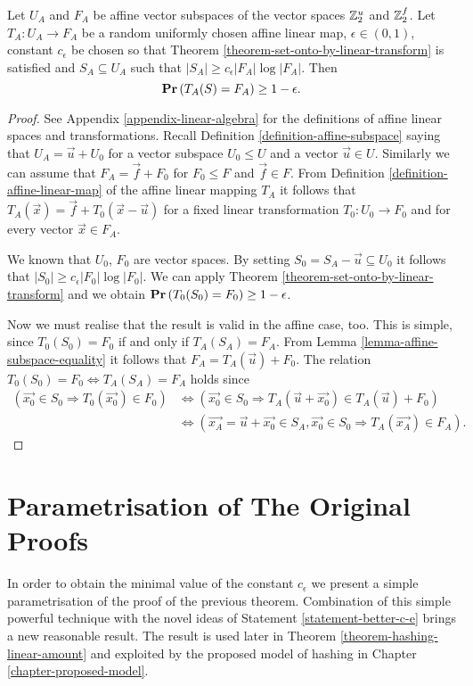 \begin{corollary}
\label{corollary-affine-e2}
Let $U_A$ and $F_A$ be affine vector subspaces of the vector spaces $\mathbb{Z}_{2}^{u}$ and $\mathbb{Z}_{2}^{f}$. Let $T_A: U_A \rightarrow F_A$ be a random uniformly chosen affine linear map, $\epsilon \in (0, 1)$, constant $c_\epsilon$ be chosen so that Theorem \ref{theorem-set-onto-by-linear-transform} is satisfied and $S_A \subseteq U_A$ such that $|S_A| \geq c_\epsilon |F_A| \log |F_A|$. Then
\[
	\mathbf{Pr}\left(T_A(S) = F_A\right) \geq 1 - \epsilon \text{.}
\]
\end{corollary}
\begin{proof}
See Appendix \ref{appendix-linear-algebra} for the definitions of affine linear spaces and transformations. Recall Definition \ref{definition-affine-subspace} saying that $U_A = \vec{u} + U_0$ for a vector subspace $U_0 \leq U$ and a vector $\vec{u} \in U$. Similarly we can assume that $F_A = \vec{f} + F_0$ for $F_0 \leq F$ and $\vec{f} \in F$. From Definition \ref{definition-affine-linear-map} of the affine linear mapping $T_A$ it follows that $T_A(\vec{x}) = \vec{f} + T_0(\vec{x} - \vec{u})$ for a fixed linear transformation $T_0: U_0 \rightarrow F_0$ and for every vector $\vec{x} \in F_A$.

We known that $U_0$, $F_0$ are vector spaces. By setting $S_0 = S_A - \vec{u} \subseteq U_0$ it follows that $|S_0| \geq c_\epsilon |F_0| \log |F_0|$. We can apply Theorem \ref{theorem-set-onto-by-linear-transform} and we obtain $\mathbf{Pr}\left(T_0(S_0) = F_0\right) \geq 1 - \epsilon$.

Now we must realise that the result is valid in the affine case, too. This is simple, since $T_0(S_0) = F_0$ if and only if $T_A(S_A) = F_A$. From Lemma \ref{lemma-affine-subspace-equality} it follows that $F_A = T_A(\vec{u}) + F_0$. The relation $T_0(S_0) = F_0 \Leftrightarrow T_A(S_A) = F_A$ holds since
\[
\begin{split}
(\vec{x_0} \in S_0 \Rightarrow T_0(\vec{x_0}) \in F_0) 
	& \Leftrightarrow (\vec{x_0} \in S_0 \Rightarrow T_A(\vec{u} + \vec{x_0}) \in T_A(\vec{u}) + F_0) \\
	& \Leftrightarrow (\vec{x_A} = \vec{u} + \vec{x_0} \in S_A, \vec{x_0} \in S_0 \Rightarrow T_A(\vec{x_A}) \in F_A) \text{.}
\end{split}
\]
\end{proof}

\section{Parametrisation of The Original Proofs}
In order to obtain the minimal value of the constant $c_\epsilon$ we present a simple parametrisation of the proof of the previous theorem. Combination of this simple powerful technique with the novel ideas of Statement \ref{statement-better-c-e} brings a new reasonable result. The result is used later in Theorem \ref{theorem-hashing-linear-amount} and exploited by the proposed model of hashing in Chapter \ref{chapter-proposed-model}.

